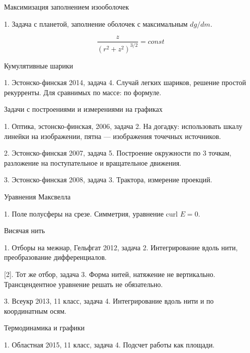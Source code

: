 \documentclass[12pt,a4paper]{article}
\begin{document}
{\large{Максимизация заполнением изооболочек}}

1. Задача с планетой, заполнение оболочек с максимальным $dg/dm$.

$$
  \frac{z}{\left(r^2+z^2\right)^{3/2}}=const
$$

{\large{Кумулятивные шарики}}

1. Эстонско-финская 2014, задача 4. Случай легких шариков, решение простой рекурренты. Для сравнимых по массе: по формуле.

{\large{Задачи с построениями и измерениями на графиках}}

1. Оптика, эстонско-финская, 2006, задача 2. На догадку: использовать шкалу линейки на изображении, пятна --- изображения точечных источников.

2. Эстонско-финская 2007, задача 5. Построение окружности по 3 точкам, разложение на поступательное и вращательное движения.

3. Эстонско-финская 2008, задача 3. Трактора, измерение проекций.

{\large{Уравнения Максвелла}}

1. Поле полусферы на срезе. Симметрия, уравнение $\text{curl } E=0$.

{\large{Висячая нить}}

1. Отборы на межнар, Гельфгат 2012, задача 2. Интегрирование вдоль нити, преобразование дифференциалов.

[2]. Тот же отбор, задача 3. Форма нитей, натяжение не вертикально. Трансцендентное уравнение решать не обязательно.

3. Всеукр 2013, 11 класс, задача 4. Интегрирование вдоль нити и по координатным осям.

{\large{Термодинамика и графики}}

1. Областная 2015, 11 класс, задача 4. Подсчет работы как площади.
\end{document}
